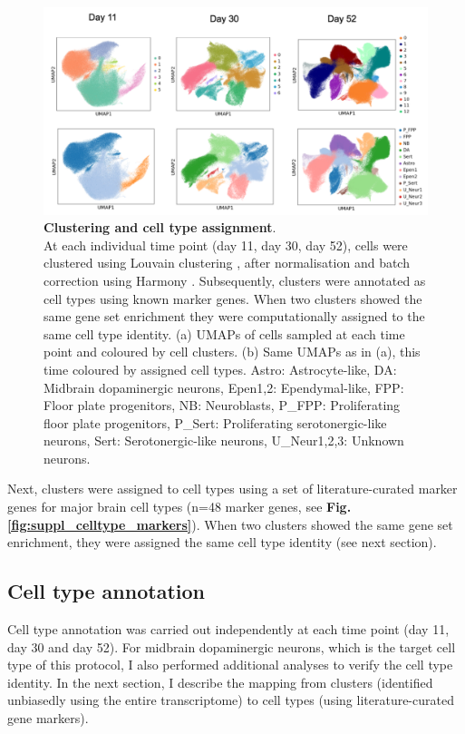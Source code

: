 \begin{figure}[h]
\centering
\includegraphics[width=16cm]{Chapter5/Fig/neuroseq_clusters_celltypes.png}
\caption[Clustering and cell type assignment]{\textbf{Clustering and cell type assignment}.\\
At each individual time point (day 11, day 30, day 52), cells were clustered using Louvain clustering \cite{blondel2008fast}, after normalisation and batch correction using Harmony \cite{korsunsky2019fast}.
Subsequently, clusters were annotated as cell types using known marker genes. 
When two clusters showed the same gene set enrichment they were computationally assigned to the same cell type identity. 
(a) UMAPs of cells sampled at each time point and coloured by cell clusters. 
(b) Same UMAPs as in (a), this time coloured by assigned cell types.
Astro: Astrocyte-like, DA: Midbrain dopaminergic neurons, Epen1,2: Ependymal-like, FPP: Floor plate progenitors, NB: Neuroblasts, P\_FPP: Proliferating floor plate progenitors, P\_Sert: Proliferating serotonergic-like neurons, Sert: Serotonergic-like neurons, U\_Neur1,2,3: Unknown neurons.}
\label{fig:neuroseq_clusters}
\end{figure}

Next, clusters were assigned to cell types using a set of literature-curated marker genes for major brain cell types (n=48 marker genes, see \textbf{Fig. \ref{fig:suppl_celltype_markers}}).
When two clusters showed the same gene set enrichment, they were assigned the same cell type identity (see next section).

\subsection{Cell type annotation}
Cell type annotation was carried out independently at each time point (day 11, day 30 and day 52).
For midbrain dopaminergic neurons, which is the target cell type of this protocol, I also performed additional analyses to verify the cell type identity.
In the next section, I describe the mapping from clusters (identified unbiasedly using the entire transcriptome) to cell types (using literature-curated gene markers).


